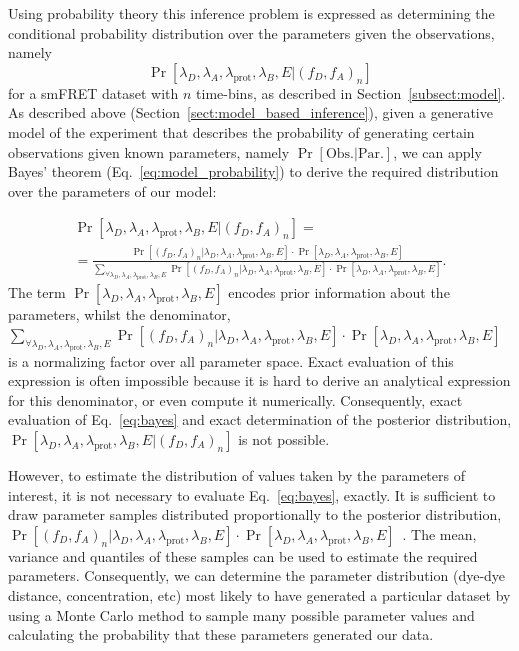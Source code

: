 Using probability theory this inference problem is expressed as determining the conditional probability distribution over the parameters given the observations, namely $$\Pr[\lambda_D, \lambda_A, \lambda_{\text{prot}}, \lambda_B, E | (f_D, f_A)_n]$$ for a smFRET dataset with $n$ time-bins, as described in Section~\ref{subsect:model}. As described above (Section~\ref{sect:model_based_inference}), given a generative model of the experiment that describes the probability of generating certain observations given known parameters, namely $\Pr[\text{Obs.} | \text{Par.}]$, we can apply Bayes' theorem (Eq.~\ref{eq:model_probability}) to derive the required distribution over the parameters of our model:

\begin{multline}
\Pr[\lambda_D, \lambda_A, \lambda_{\text{prot}}, \lambda_B, E | (f_D, f_A)_n] = \\ = \frac{\Pr[(f_D, f_A)_n |\lambda_D, \lambda_A, \lambda_{\text{prot}}, \lambda_B, E] \cdot \Pr[\lambda_D, \lambda_A, \lambda_{\text{prot}}, \lambda_B, E]}
{\sum_{\forall \lambda_D, \lambda_A, \lambda_{\text{prot}}, \lambda_B, E} \Pr[(f_D, f_A)_n | \lambda_D, \lambda_A, \lambda_{\text{prot}}, \lambda_B, E] \cdot \Pr[\lambda_D, \lambda_A, \lambda_{\text{prot}}, \lambda_B, E]}. 
\label{eq:bayes}
\end{multline}
The term $\Pr[\lambda_D, \lambda_A, \lambda_{\text{prot}}, \lambda_B, E]$ encodes prior information about the parameters, whilst the denominator, $\sum_{\forall \lambda_D, \lambda_A, \lambda_{\text{prot}}, \lambda_B, E} \Pr[(f_D, f_A)_n | \lambda_D, \lambda_A, \lambda_{\text{prot}}, \lambda_B, E] \cdot \Pr[\lambda_D, \lambda_A, \lambda_{\text{prot}}, \lambda_B, E]$ is a normalizing factor over all parameter space. Exact evaluation of this expression is often impossible because it is hard to derive an analytical expression for this denominator, or even compute it numerically. Consequently, exact evaluation of Eq.~\ref{eq:bayes} and exact determination of the posterior distribution, $\Pr[\lambda_D, \lambda_A, \lambda_{\text{prot}}, \lambda_B, E | (f_D, f_A)_n]$ is not possible.

However, to estimate the distribution of values taken by the parameters of interest, it is not necessary to evaluate Eq.~\ref{eq:bayes}, exactly. It is sufficient to draw parameter samples distributed proportionally to the posterior distribution, $\Pr[(f_D, f_A)_n |\lambda_D, \lambda_A, \lambda_{\text{prot}}, \lambda_B, E] \cdot \Pr[\lambda_D, \lambda_A, \lambda_{\text{prot}}, \lambda_B, E]$~\cite{hastings70}. The mean, variance and quantiles of these samples can be used to estimate the required parameters. Consequently, we can determine the parameter distribution (dye-dye distance, concentration, etc) most likely to have generated a particular dataset by using a Monte Carlo method to sample many possible parameter values and calculating the probability that these parameters generated our data.

